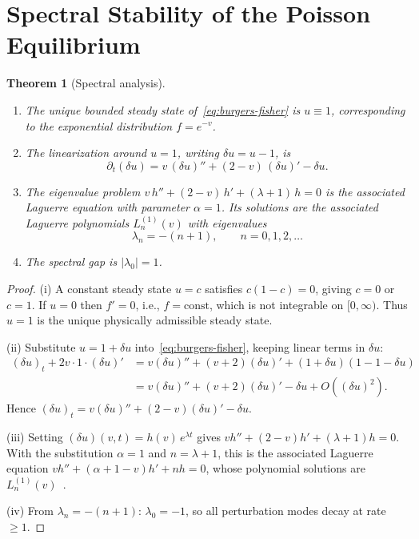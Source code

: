 \documentclass[11pt, a4paper]{amsart}
\theoremstyle{plain}
\newtheorem{theorem}{Theorem}[section]
\theoremstyle{definition}
\begin{document}
\section{Spectral Stability of the Poisson Equilibrium}
\label{sec:spectral}

\begin{theorem}[Spectral analysis]
\label{thm:spectral}
\leavevmode
\begin{enumerate}[label=\upshape(\roman*)]
\item The unique bounded steady state of~\eqref{eq:burgers-fisher} is $u \equiv 1$, corresponding to the 
exponential distribution $f = e^{-v}$.
\item The linearization around $u = 1$, writing $\delta u = u - 1$, is
\begin{equation}\label{eq:linearized}
\partial_t(\delta u) = v\,(\delta u)'' + (2 - v)\,(\delta u)' - \delta u.
\end{equation}
\item The eigenvalue problem $v\,h'' + (2-v)\,h' + (\lambda+1)\,h = 0$ is the associated Laguerre 
equation with parameter $\alpha = 1$.
Its solutions are the associated Laguerre polynomials $L_n^{(1)}(v)$ with eigenvalues
\begin{equation}\label{eq:eigenvalues}
\lambda_n = -(n+1), \qquad n = 0, 1, 2, \ldots
\end{equation}
\item The spectral gap is $|\lambda_0| = 1$.
\end{enumerate}
\end{theorem}

\begin{proof}
(i) A constant steady state $u = c$ satisfies $c(1-c) = 0$, giving $c = 0$ or $c = 1$.
If $u = 0$ then $f' = 0$, i.e., $f = \text{const}$, which is not integrable on $[0,\infty)$.
Thus $u = 1$ is the unique physically admissible steady state.

(ii) Substitute $u = 1 + \delta u$ into~\eqref{eq:burgers-fisher}, keeping linear terms in $\delta u$:
\begin{align*}
(\delta u)_t + 2v \cdot 1 \cdot (\delta u)' &= v(\delta u)'' + (v+2)(\delta u)' + (1 + \delta u)(1 - 1 - \delta u) \\
&= v(\delta u)'' + (v+2)(\delta u)' - \delta u + O((\delta u)^2).
\end{align*}
Hence $(\delta u)_t = v(\delta u)'' + (2-v)(\delta u)' - \delta u$.

(iii) Setting $(\delta u)(v,t) = h(v)\,e^{\lambda t}$ gives $v h'' + (2-v)h' + (\lambda + 1)h = 0$.
With the substitution $\alpha = 1$ and $n = \lambda + 1$, this is the associated Laguerre equation $v h'' + (\alpha + 1 - v)h' + nh = 0$, whose polynomial solutions are $L_n^{(1)}(v)$~\cite{Szego1975}.

(iv) From $\lambda_n = -(n+1)$: $\lambda_0 = -1$, so all perturbation modes decay at rate $\ge 1$.
\end{proof}
\end{document}
